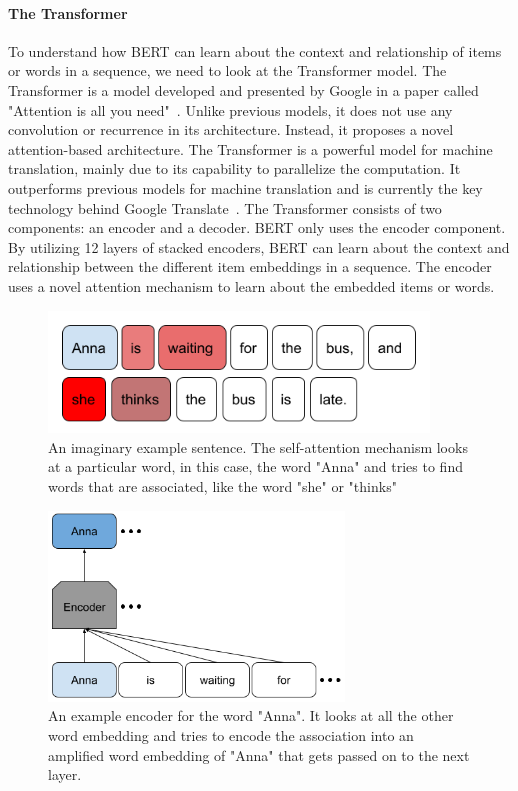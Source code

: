 \paragraph{The Transformer}
To understand how BERT can learn about the context and relationship of items or words in a sequence, we need to look at the Transformer model. The Transformer is a model developed and presented by Google in a paper called "Attention is all you need"~\cite{vaswani2017attention}. Unlike previous models, it does not use any convolution or recurrence in its architecture. Instead, it proposes a novel attention-based architecture. The Transformer is a powerful model for machine translation, mainly due to its capability to parallelize the computation. It outperforms previous models for machine translation and is currently the key technology behind Google Translate~\cite{googleaiblog}. The Transformer consists of two components: an encoder and a decoder. BERT only uses the encoder component. By utilizing 12 layers of stacked encoders, BERT can learn about the context and relationship between the different item embeddings in a sequence. The encoder uses a novel attention mechanism to learn about the embedded items or words.  

\begin{figure}[htbp]
\centering
\includegraphics[width=0.9\textwidth]{images/illustrations/bert_self_attention_sentence.png}
\caption{An imaginary example sentence. The self-attention mechanism looks at a particular word, in this case, the word "Anna" and tries to find words that are associated, like the word "she" or "thinks"}
\label{fig:bert_self_attention_sentence}
\end{figure}

\begin{figure}[htbp]
\centering
\includegraphics[width=0.7\textwidth]{images/illustrations/bert_self_attention_one_word.png}
\caption{An example encoder for the word "Anna". It looks at all the other word embedding and tries to encode the association into an amplified word embedding of "Anna" that gets passed on to the next layer.}
\label{fig:bert_self_attention_one_word}
\end{figure}

